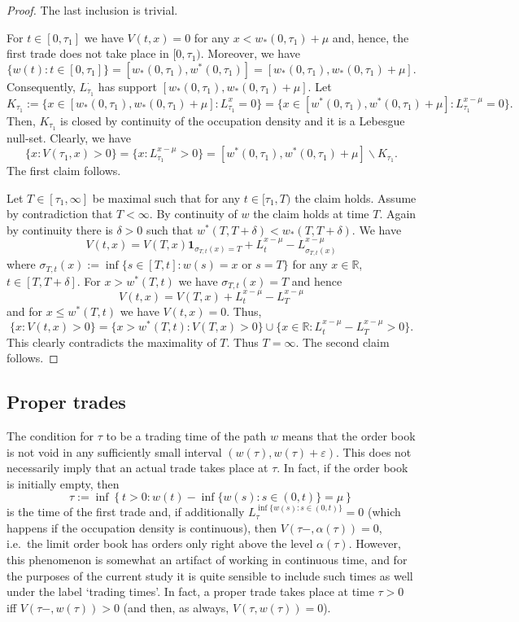 \documentclass[11pt]{scrartcl}
\begin{document}
\begin{proof}
  The last inclusion is trivial.

  For $t\in[0,\tau_1]$ we have $V(t,x) = 0$ for any $x<w_\ast(0,\tau_1)+\mu$ and, hence, the first trade does not take place in $[0,\tau_1)$. 
  Moreover, we have 
  $$\{w(t):t\in[0,\tau_1]\} = [w_\ast(0,\tau_1),w^*(0,\tau_1)] = [w_\ast(0,\tau_1),w_\ast(0,\tau_1)+\mu].$$
  Consequently, $L_{\tau_1}^{\cdot}$ has support $[w_\ast(0,\tau_1),w_\ast(0,\tau_1)+\mu]$. Let 
  $$K_{\tau_1}:=\{x\in[w_\ast(0,\tau_1),w_\ast(0,\tau_1)+\mu]: L_{\tau_1}^x=0\} = \{x\in[w^\ast(0,\tau_1),w^\ast(0,\tau_1)+\mu]: L_{\tau_1}^{x-\mu}=0\}.$$
Then, $K_{\tau_1}$ is closed by continuity of the occupation density and it is a Lebesgue null-set. Clearly, we have 
  $$ \{x: V(\tau_1,x)>0 \} = \{x: L_{\tau_1}^{x-\mu}>0\} = [w^\ast(0,\tau_1),w^\ast(0,\tau_1)+\mu]\backslash K_{\tau_1}. $$
  The first claim follows.
  
 Let $T \in [\tau_1,\infty]$ be maximal such that for any $t\in [\tau_1,T)$ the claim holds. Assume by contradiction that $T<\infty$. By continuity of $w$ the claim holds at time $T$. Again by continuity there is $\delta>0$ such that $w^\ast(T,T+\delta) < w_\ast(T,T+\delta)$. We have
  $$ V(t,x) = V(T,x)\mathbf1_{\sigma_{T,t}(x)=T} + L^{x-\mu}_t-L^{x-\mu}_{\sigma_{T,t}(x)} $$
 where $\sigma_{T,t}(x) := \inf\{s\in [T,t]: w(s) = x\text{ or }s=T\}$ for any $x\in\mathbb R$, $t\in [T,T+\delta]$. For $x> w^*(T,t)$ we have $\sigma_{T,t}(x) = T$ and hence 
 $$ V(t,x) = V(T,x) + L^{x-\mu}_t-L^{x-\mu}_{T} $$
 and for $x \leq w^*(T,t)$ we have $ V(t,x) = 0$. Thus,
  $$ \{x: V(t,x) >0\} = \{x > w^*(T,t) : V(T,x)>0\} \cup \{x \in\mathbb R: L^{x-\mu}_t-L^{x-\mu}_{T}>0 \}. $$
This clearly contradicts the maximality of $T$. Thus $T=\infty$. The second claim follows.
\end{proof}

\subsection{Proper trades\label{proper trades}}

The condition for $\tau$ to be a trading time of the path $w$ means that the
order book is not void in any sufficiently small interval $(w(\tau),w\left(
\tau\right) +\varepsilon)$. This does not necessarily imply that an actual
trade takes place at $\tau$. In fact, if the order book is initially empty,
then 
\begin{equation*}
\tau:=\inf\left\{ t>0:w(t)-\inf\{w(s):s\in (0,t)\}=\mu\right\}
\end{equation*}
is the time of the first trade and, if additionally $L_\tau^{\inf\{w(s):s\in
(0,t)\}} = 0$ (which happens if the occupation density is continuous), then $V(\tau-,\alpha(\tau)) = 0$, i.e.\ the limit order book has orders only right
above the level $\alpha(\tau)$. However, this phenomenon is somewhat an
artifact of working in continuous time, and for the purposes of the current
study it is quite sensible to include such times as well under the label
`trading times'. In fact, a proper trade takes place at time $\tau>0$ iff $V\left( \tau {-},w({\tau})\right) >0$ (and then, as always, $V\left( \tau,w({\tau })\right) =0$).
\end{document}
